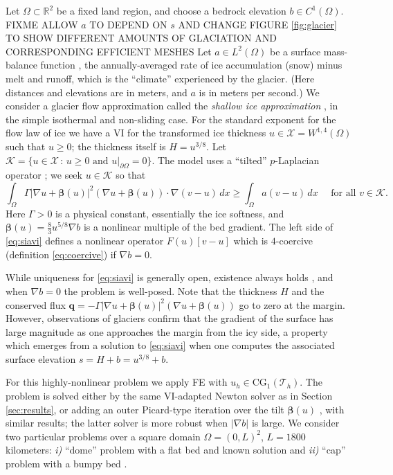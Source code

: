 \documentclass[]{interact}
\theoremstyle{plain}%
\theoremstyle{definition}
\theoremstyle{remark}
\newcommand{\RR}{\mathbb{R}}
\newcommand{\grad}{\nabla}
\newcommand{\bq}{\mathbf{q}}
\newcommand{\cK}{\mathcal{K}}
\newcommand{\cT}{\mathcal{T}}
\newcommand{\cX}{\mathcal{X}}
\newcommand{\CG}{\text{CG}}
\begin{document}
Let $\Omega \subset \RR^2$ be a fixed land region, and choose a bedrock elevation $b \in C^1(\Omega)$.  FIXME ALLOW $a$ TO DEPEND ON $s$ AND CHANGE FIGURE \ref{fig:glacier} TO SHOW DIFFERENT AMOUNTS OF GLACIATION AND CORRESPONDING EFFICIENT MESHES Let $a \in L^2(\Omega)$ be a surface mass-balance function \cite{GreveBlatter2009}, the annually-averaged rate of ice accumulation (snow) minus melt and runoff, which is the ``climate'' experienced by the glacier.  (Here distances and elevations are in meters, and $a$ is in meters per second.)  We consider a glacier flow approximation called the \emph{shallow ice approximation} \cite{GreveBlatter2009}, in the simple isothermal and non-sliding case.   For the standard exponent for the flow law of ice \cite{GreveBlatter2009} we have a VI for the transformed ice thickness $u\in \cX = W^{1,4}(\Omega)$ such that $u\ge 0$; the thickness itself is $H=u^{3/8}$.  Let $\cK = \{u \in \cX\,:\,u\ge 0 \text{ and } u|_{\partial\Omega}=0\}$.  The model uses a ``tilted'' $p$-Laplacian operator \cite{JouvetBueler2012}; we seek $u\in\cK$ so that
\begin{equation}
\int_\Omega \Gamma |\grad u + \bm{\beta}(u)|^2 (\grad u + \bm{\beta}(u)) \cdot \grad (v-u) \,dx \ge \int_\Omega a (v-u)\,dx \quad \text{ for all } v \in \cK. \label{eq:siavi}
\end{equation}
Here $\Gamma>0$ is a physical constant, essentially the ice softness, and $\bm{\beta}(u)=\frac{8}{3} u^{5/8} \grad b$ is a nonlinear multiple of the bed gradient.  The left side of \eqref{eq:siavi} defines a nonlinear operator $F(u)[v-u]$ which is $4$-coercive (definition \eqref{eq:coercive}) if $\grad b=0$.

While uniqueness for \eqref{eq:siavi} is generally open, existence always holds \cite{JouvetBueler2012}, and when $\grad b=0$ the problem is well-posed.  Note that the thickness $H$ and the conserved flux $\bq = - \Gamma |\grad u + \bm{\beta}(u)|^2 (\grad u + \bm{\beta}(u))$ go to zero at the margin.  However, observations of glaciers confirm that the gradient of the surface has large magnitude as one approaches the margin from the icy side, a property which emerges from a solution to \eqref{eq:siavi} when one computes the associated surface elevation $s=H+b = u^{3/8} + b$.

For this highly-nonlinear problem we apply FE with $u_h\in\CG_1(\cT_h)$.  The problem is solved either by the same VI-adapted Newton solver as in Section \ref{sec:results}, or adding an outer Picard-type iteration over the tilt $\bm{\beta}(u)$ \cite{JouvetBueler2012}, with similar results; the latter solver is more robust when $|\grad b|$ is large.  We consider two particular problems over a square domain $\Omega=(0,L)^2$, $L=1800$ kilometers: \emph{i)} ``dome'' problem with a flat bed and known solution \cite{Bueler2016} and \emph{ii)} ``cap'' problem with a bumpy bed \cite[Example 8.4]{BuelerFarrell2024}.
\end{document}
